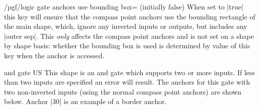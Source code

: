 \begin{key}{/pgf/logic gate anchors use bounding box= (initially false)}
  When set to |true| this key will ensure that the 
  compass point anchors use the bounding rectangle of the
  main shape, which, ignore any inverted inputs or outputs, but
  includes any |outer sep|. 
  This \emph{only} affects the compass point anchors
  and is not set on a shape by shape basis: whether the bounding
  box is used is determined by value of this key when the anchor
  is accessed.

\begin{codeexample}[]
\end{codeexample} 

\end{key}




\begin{shape}{and gate US}
  This shape is an and gate which supports two or more inputs. If
  less than two inputs are specified an error will result. 
  The anchors for this gate with two
  non-inverted inputs (using the normal compass point anchors) are
  shown below. Anchor |30| is an example of a border anchor.
  
\begin{codeexample}[]
\Huge
{}
\end{codeexample}
\end{shape}

